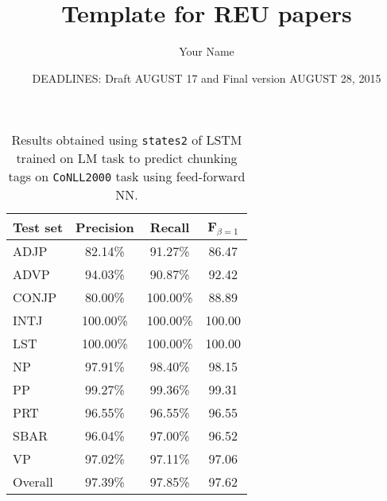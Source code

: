 \documentclass[psamsfonts]{amsart}
\title{Template for REU papers}
\author{Your Name}
\date{DEADLINES: Draft AUGUST 17 and Final version AUGUST 28, 2015}
\theoremstyle{definition}
\theoremstyle{remark}
\numberwithin{equation}{section}
\begin{document}
\begin{table}[t]
	\begin{center}
		\begin{tabular}{|l|c|c|c|}\cline{2-4}
			\multicolumn{1}{l|}{Test set}
        & Precision &  Recall  & F$_{\beta=1}$ \\\hline
        ADJP    &   82.14\% &  91.27\% &  86.47 \\
        ADVP    &   94.03\% &  90.87\% &  92.42 \\
        CONJP   &   80.00\% & 100.00\% &  88.89 \\
        INTJ    &  100.00\% & 100.00\% & 100.00 \\
        LST     &  100.00\% & 100.00\% & 100.00 \\
        NP      &   97.91\% &  98.40\% &  98.15 \\
        PP      &   99.27\% &  99.36\% &  99.31 \\
        PRT     &   96.55\% &  96.55\% &  96.55 \\
        SBAR    &   96.04\% &  97.00\% &  96.52 \\
        VP      &   97.02\% &  97.11\% &  97.06 \\\hline
        Overall &   97.39\% &  97.85\% &  97.62 \\\hline
\end{tabular}
\end{center}
\caption{
	Results obtained using \texttt{states2} of LSTM trained on LM task to predict chunking tags on \texttt{CoNLL2000} task using feed-forward NN.
} 
\label{tab-final}
\end{table}
\end{document}

